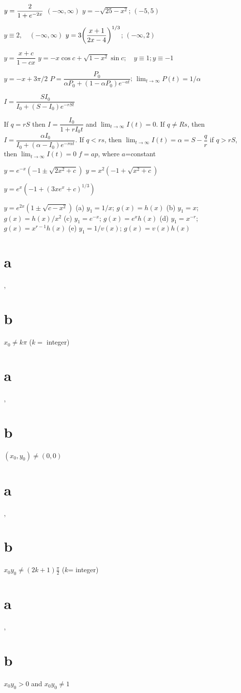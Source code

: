  $y=\displaystyle{\frac{2}{1+e^{-2x}}}$   \quad $(-\infty,\infty)$
 $y=- \sqrt{25-x^2}$;   \quad $(-5,5)$

 $y \equiv 2, \quad (- \infty,\infty)$
 $y=3\displaystyle{\left(\frac{x+1}{2x-4}\right)^{1/3}}$;
\quad $(-\infty,2)$

 $y=\dfrac{x+c}{1-cx}$
 $y=-x\cos c+\sqrt{1-x^2}\sin c;
 \quad y \equiv 1;   y \equiv -1$

 $y=-x+3\pi/2$
  $P=\dfrac{P_0}{\alpha P_0+(1-\alpha P_0)e^{-at}}$;   $\lim_{t\to\infty}P(t)=1/\alpha$

 $I=\dfrac{SI_0}{I_0+(S-I_0)e^{-rSt}}$

 If $q=rS$ then $I=\dfrac{I_0}{1+rI_0t}$ and
$\lim_{t\to\infty}I(t)=0$. If $q\ne Rs$, then
$I=\dfrac{\alpha I_0}{I_0+(\alpha-I_0)e^{-r\alpha t}}$. If $q<rs$, then
$\lim_{t\to\infty}I(t)=\alpha=S-\dfrac{q}{r}$
if $q>rS$, then
$\lim_{t\to\infty}I(t)=0$
$f=ap$, where $a$=constant

 $y=e^{-x}\left(-1\pm\sqrt{2x^2+c}\right)$
 $y=x^2\left(-1+\sqrt{x^2+c}\right)$

 $y=e^x\left(-1+(3xe^x+c)^{1/3}\right)$

  $y=e^{2x}(1\pm\sqrt{c-x^2})$
(a) $y_1=1/x$;  \quad $g(x)=h(x)$
  (b) $y_1=x$;  \quad $g(x)=h(x)/x^2$
\;  (c) $y_1=e^{-x}$;   $g(x)=e^xh(x)$
 (d) $y_1=x^{-r}$;\;   $g(x)=x^{r-1}h(x)$
\;    (e)\;    $y_1=1/v(x)$;\;   $g(x)=v(x)h(x)$


 \part{a},\, \part{b} $x_0\ne k \pi$ ($k=$ integer)
  \part{a}, \,\part{b} $(x_0,y_0)\ne(0,0)$

\part{a},\, \part{b} $x_0y_0\ne(2k+1)\frac{\pi}{2}$  ($k$= integer)
 \part{a},\, \part{b} $x_0y_0>0$ and $x_0y_0\ne1$

